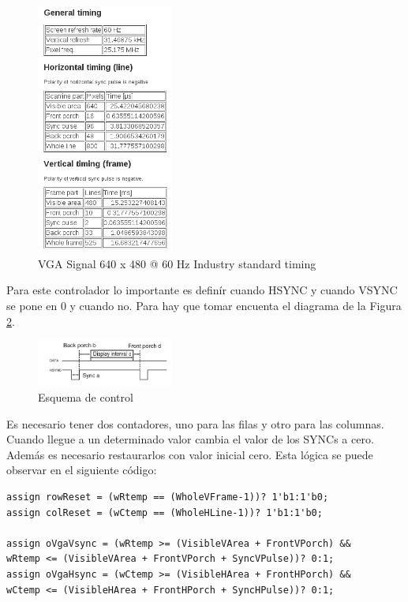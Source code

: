 \documentclass[10pt]{article}
\begin{document}
\begin{figure}[hbtp]
\centering
\includegraphics[width=0.4\textwidth]{vga-data.png}
\caption{VGA Signal 640 x 480 @ 60 Hz Industry standard timing}
\label{vga-data}
\end{figure}

Para este controlador lo importante es definír cuando HSYNC y cuando VSYNC se pone en 0 y cuando no. Para hay que tomar encuenta el diagrama de la Figura \ref{vga-pulse}.\\

\begin{figure}[hbtp]
\centering
\includegraphics[width=0.4\textwidth]{vga-pulse.png}
\caption{Esquema de control}
\label{vga-pulse}
\end{figure}

Es necesario tener dos contadores, uno para las filas y otro para las columnas. Cuando llegue a un determinado valor cambia el valor de los SYNCs a cero. Además es necesario restaurarlos con valor inicial cero. Esta lógica se puede observar en el siguiente código:\\

\begin{lstlisting}
assign rowReset = (wRtemp == (WholeVFrame-1))? 1'b1:1'b0;
assign colReset = (wCtemp == (WholeHLine-1))? 1'b1:1'b0;

assign oVgaVsync = (wRtemp >= (VisibleVArea + FrontVPorch) && 
wRtemp <= (VisibleVArea + FrontVPorch + SyncVPulse))? 0:1;
assign oVgaHsync = (wCtemp >= (VisibleHArea + FrontHPorch) && 
wCtemp <= (VisibleHArea + FrontHPorch + SyncHPulse))? 0:1;
\end{lstlisting}
\end{document}
